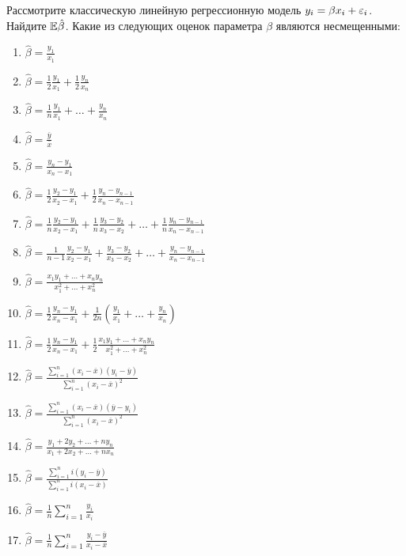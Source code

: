 \documentclass[pdftex,11pt,openany]{book}
\begin{document}
\begin{problem}
 Рассмотрите классическую линейную регрессионную модель $y_i = \beta x_i + \varepsilon_i$. Найдите $\mathbb{E} \hat{\beta}$. Какие из следующих оценок параметра $\beta$ являются несмещенными:

\begin{enumerate}
\item $\hat{\beta} = \frac{y_1}{x_1}$
\item $\hat{\beta} = \frac{1}{2} \frac{y_1}{x_1} + \frac{1}{2} \frac{y_n}{x_n}$
\item $\hat{\beta} = \frac{1}{n}  \frac{y_1}{x_1} + \ldots + \frac{y_n}{x_n} $
\item $\hat{\beta} = \frac{\overline{y}}{\overline{x}}$
\item $\hat{\beta} = \frac{y_n - y_1}{x_n - x_1}$
\item $\hat{\beta} = \frac{1}{2} \frac{y_2 - y_1}{x_2 - x_1} + \frac{1}{2} \frac{y_n - y_{n-1}}{x_n - x_{n-1}}$
\item $\hat{\beta} = \frac{1}{n} \frac{y_2 - y_1}{x_2 - x_1} + \frac{1}{n} \frac{y_3 - y_2}{x_3 - x_2} + \ldots + \frac{1}{n} \frac{y_n - y_{n-1}}{x_n - x_{n-1}}$
\item $\hat{\beta} = \frac{1}{n-1}  \frac{y_2 - y_1}{x_2 - x_1} + \frac{y_3 - y_2}{x_3 - x_2} + \ldots + \frac{y_n - y_{n-1}}{x_n - x_{n-1}} $
\item $\hat{\beta} = \frac{x_1 y_1 + \ldots + x_n y_n}{x_1^2 + \ldots + x_n^2}$
\item $\hat{\beta} = \frac{1}{2} \frac{y_n - y_1}{x_n - x_1} + \frac{1}{2n}  \left( \frac{y_1}{x_1} + \ldots + \frac{y_n}{x_n} \right) $
\item $\hat{\beta} =  \frac{1}{2} \frac{y_n - y_1}{x_n - x_1} + \frac{1}{2} \frac{x_1 y_1 + \ldots + x_n y_n}{x_1^2 + \ldots + x_n^2}$
\item $\hat{\beta} = \frac{\sum_{i=1}^n (x_i - \overline{x})(y_i - \overline{y})}{\sum_{i=1}^n (x_i - \overline{x})^2}$
\item $\hat{\beta} = \frac{\sum_{i=1}^n (x_i - \overline{x})(\overline{y} - y_i)}{\sum_{i=1}^n (x_i - \overline{x})^2}$
\item $\hat{\beta} = \frac{y_1 + 2 y_2 + \ldots + n y_n}{x_1 + 2 x_2 + \ldots + n x_n}$
\item $\hat{\beta} = \frac{\sum_{i=1}^n i(y_i - \overline{y})}{\sum_{i=1}^n i(x_i - \overline{x})}$
\item $\hat{\beta} = \frac{1}{n} \sum_{i=1}^n \frac{y_i}{x_i}$
\item $\hat{\beta} = \frac{1}{n} \sum_{i=1}^n \frac{y_i - \overline{y}}{x_i - \overline{x}}$
\end{enumerate}
\end{problem}
\end{document}
